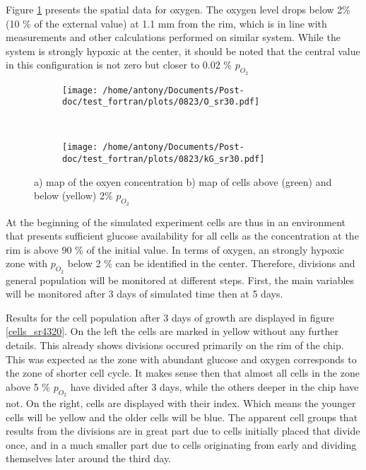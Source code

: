 \documentclass[11pt,a4paper]{article}
\begin{document}
Figure \ref{O_sr30}	presents the spatial data for oxygen. The oxygen level drops below 2\% (10 \% of the external value) at 1.1 mm from the rim, which is in line with measurements and other calculations performed on similar system. While the system is strongly hypoxic at the center, it should be noted that the central value in this configuration is not zero but closer to 0.02 \% $p_{O_2}$


\begin{figure}[ht!]
	\begin{subfigure}{0.45\textwidth}
	\centering
	\texttt{[image: /home/antony/Documents/Post-doc/test\_fortran/plots/0823/O\_sr30.pdf]}
	\caption{ }
	\end{subfigure}
	~~ \hspace{1cm}
	\begin{subfigure}{0.45\textwidth}
	\texttt{[image: /home/antony/Documents/Post-doc/test\_fortran/plots/0823/kG\_sr30.pdf]}
		\caption{ }
	\end{subfigure}
	\caption{a) map of the oxyen concentration b) map of cells above (green) and below (yellow) 2\% $p_{O_2}$\label{O_sr30}}
	\end{figure}

At the beginning of the simulated experiment cells are thus in an environment that presents sufficient glucose availability for all cells as the concentration at the rim is above 90 \% of the initial value. In terms of oxygen, an strongly hypoxic zone with $p_{O_2}$ below 2 \% can be identified in the center. Therefore, divisions and general population will be monitored at different steps. First, the main variables will be monitored after 3 days of simulated time then at 5 days.

Results for the cell population after 3 days of growth are displayed in figure \ref{cells_sr4320}. On the left the cells are marked in yellow without any further details. This already shows divisions occured primarily on the rim of the chip. This was expected as the zone with abundant glucose and oxygen corresponds to the zone of shorter cell cycle. It makes sense then that almost all cells in the zone above 5 \% $p_{O_2}$ have divided after 3 days, while the others deeper in the chip have not. On the right, cells are displayed with their index. Which means the younger cells will be yellow and the older cells will be blue. The apparent cell groups that results from the divisions are in great part due to cells initially placed that divide once, and in a much smaller part due to cells originating from early and dividing themselves later around the third day.
\end{document}
